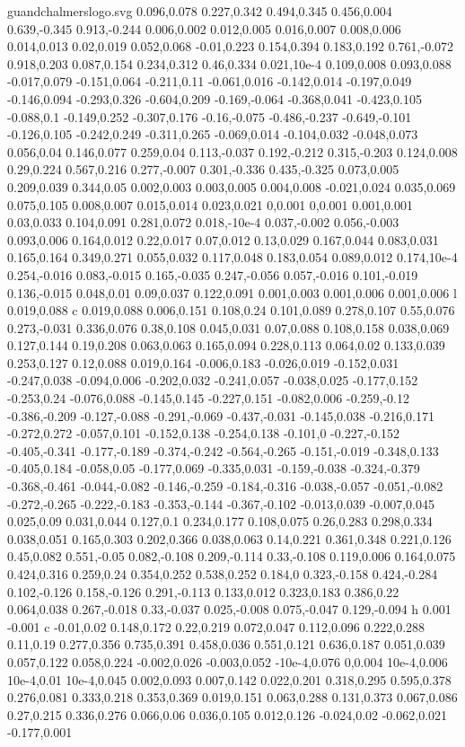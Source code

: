 \begin{filecontents}[noheader]{guandchalmerslogo.svg}
0.096,0.078 0.227,0.342 0.494,0.345 0.456,0.004 0.639,-0.345 0.913,-0.244 0.006,0.002 0.012,0.005 0.016,0.007 0.008,0.006 0.014,0.013 0.02,0.019 0.052,0.068 -0.01,0.223 0.154,0.394 0.183,0.192 0.761,-0.072 0.918,0.203 0.087,0.154 0.234,0.312 0.46,0.334 0.021,10e-4 0.109,0.008 0.093,0.088 -0.017,0.079 -0.151,0.064 -0.211,0.11 -0.061,0.016 -0.142,0.014 -0.197,0.049 -0.146,0.094 -0.293,0.326 -0.604,0.209 -0.169,-0.064 -0.368,0.041 -0.423,0.105 -0.088,0.1 -0.149,0.252 -0.307,0.176 -0.16,-0.075 -0.486,-0.237 -0.649,-0.101 -0.126,0.105 -0.242,0.249 -0.311,0.265 -0.069,0.014 -0.104,0.032 -0.048,0.073 0.056,0.04 0.146,0.077 0.259,0.04 0.113,-0.037 0.192,-0.212 0.315,-0.203 0.124,0.008 0.29,0.224 0.567,0.216 0.277,-0.007 0.301,-0.336 0.435,-0.325 0.073,0.005 0.209,0.039 0.344,0.05 0.002,0.003 0.003,0.005 0.004,0.008 -0.021,0.024 0.035,0.069 0.075,0.105 0.008,0.007 0.015,0.014 0.023,0.021 0,0.001 0,0.001 0.001,0.001 0.03,0.033 0.104,0.091 0.281,0.072 0.018,-10e-4 0.037,-0.002 0.056,-0.003 0.093,0.006 0.164,0.012 0.22,0.017 0.07,0.012 0.13,0.029 0.167,0.044 0.083,0.031 0.165,0.164 0.349,0.271 0.055,0.032 0.117,0.048 0.183,0.054 0.089,0.012 0.174,10e-4 0.254,-0.016 0.083,-0.015 0.165,-0.035 0.247,-0.056 0.057,-0.016 0.101,-0.019 0.136,-0.015 0.048,0.01 0.09,0.037 0.122,0.091 0.001,0.003 0.001,0.006 0.001,0.006 l 0.019,0.088 c 0.019,0.088 0.006,0.151 0.108,0.24 0.101,0.089 0.278,0.107 0.55,0.076 0.273,-0.031 0.336,0.076 0.38,0.108 0.045,0.031 0.07,0.088 0.108,0.158 0.038,0.069 0.127,0.144 0.19,0.208 0.063,0.063 0.165,0.094 0.228,0.113 0.064,0.02 0.133,0.039 0.253,0.127 0.12,0.088 0.019,0.164 -0.006,0.183 -0.026,0.019 -0.152,0.031 -0.247,0.038 -0.094,0.006 -0.202,0.032 -0.241,0.057 -0.038,0.025 -0.177,0.152 -0.253,0.24 -0.076,0.088 -0.145,0.145 -0.227,0.151 -0.082,0.006 -0.259,-0.12 -0.386,-0.209 -0.127,-0.088 -0.291,-0.069 -0.437,-0.031 -0.145,0.038 -0.216,0.171 -0.272,0.272 -0.057,0.101 -0.152,0.138 -0.254,0.138 -0.101,0 -0.227,-0.152 -0.405,-0.341 -0.177,-0.189 -0.374,-0.242 -0.564,-0.265 -0.151,-0.019 -0.348,0.133 -0.405,0.184 -0.058,0.05 -0.177,0.069 -0.335,0.031 -0.159,-0.038 -0.324,-0.379 -0.368,-0.461 -0.044,-0.082 -0.146,-0.259 -0.184,-0.316 -0.038,-0.057 -0.051,-0.082 -0.272,-0.265 -0.222,-0.183 -0.353,-0.144 -0.367,-0.102 -0.013,0.039 -0.007,0.045 0.025,0.09 0.031,0.044 0.127,0.1 0.234,0.177 0.108,0.075 0.26,0.283 0.298,0.334 0.038,0.051 0.165,0.303 0.202,0.366 0.038,0.063 0.14,0.221 0.361,0.348 0.221,0.126 0.45,0.082 0.551,-0.05 0.082,-0.108 0.209,-0.114 0.33,-0.108 0.119,0.006 0.164,0.075 0.424,0.316 0.259,0.24 0.354,0.252 0.538,0.252 0.184,0 0.323,-0.158 0.424,-0.284 0.102,-0.126 0.158,-0.126 0.291,-0.113 0.133,0.012 0.323,0.183 0.386,0.22 0.064,0.038 0.267,-0.018 0.33,-0.037 0.025,-0.008 0.075,-0.047 0.129,-0.094 h 0.001 -0.001 c -0.01,0.02 0.148,0.172 0.22,0.219 0.072,0.047 0.112,0.096 0.222,0.288 0.11,0.19 0.277,0.356 0.735,0.391 0.458,0.036 0.551,0.121 0.636,0.187 0.051,0.039 0.057,0.122 0.058,0.224 -0.002,0.026 -0.003,0.052 -10e-4,0.076 0,0.004 10e-4,0.006 10e-4,0.01 10e-4,0.045 0.002,0.093 0.007,0.142 0.022,0.201 0.318,0.295 0.595,0.378 0.276,0.081 0.333,0.218 0.353,0.369 0.019,0.151 0.063,0.288 0.131,0.373 0.067,0.086 0.27,0.215 0.336,0.276 0.066,0.06 0.036,0.105 0.012,0.126 -0.024,0.02 -0.062,0.021 -0.177,0.001 
\end{filecontents}
